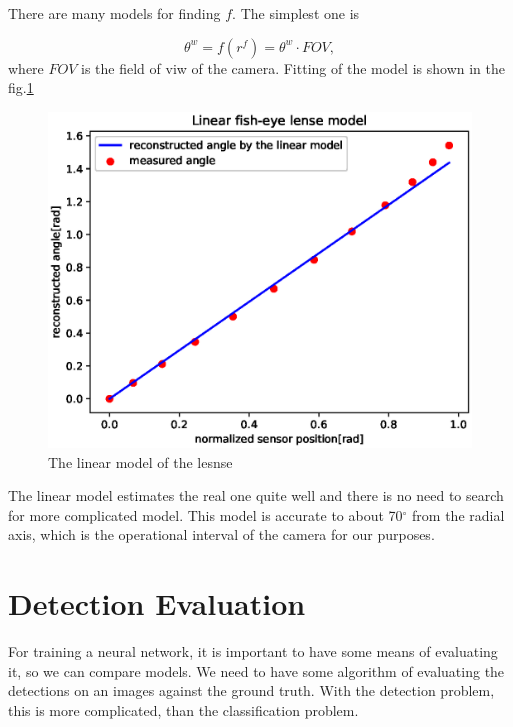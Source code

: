 \documentclass[a4paper,12pt,titlepage, twoside]{article}
\numberwithin{figure}{section}
\begin{document}
There are many models for finding $f$. The simplest one is 

\begin{equation}
\theta^w = f(r^f) = \theta^w \cdot FOV,
\end{equation}
where $FOV$ is the field of viw of the camera. Fitting of the model is shown in the fig.\ref{fig:linear_model}


\begin{figure}[h!]
\centering
\includegraphics[width=1\linewidth]{fig/linear_model.eps}
\caption{The linear model of the lesnse}
\label{fig:linear_model}
\end{figure}

The linear model estimates the real one quite well and there is no need to search for more complicated model. This model is accurate to about 70$^\circ$ from the radial axis, which is the operational interval of the camera for our purposes.







\section{Detection Evaluation}
For training a neural network, it is important to have some means of evaluating it, so we can compare models. We need to have some algorithm of evaluating the detections on an images against the ground truth. With the detection problem, this is more complicated, than the classification problem.
\end{document}
